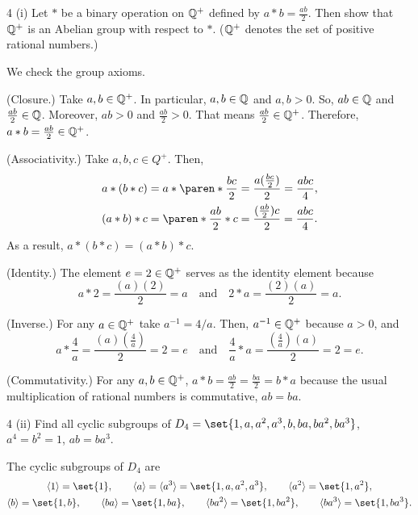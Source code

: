 \documentclass[11pt]{penrose}
\begin{document}
\begin{problem}{4 (i)}
    Let $*$ be a binary operation on $\mathbb{Q}^{+}$ defined by $a * b = \frac{ab}{2}$. Then show that $\mathbb{Q}^{+}$ is an Abelian group with respect to $*$. ($\mathbb{Q}^{+}$ denotes the set of positive rational numbers.)

    \solution We check the group axioms.

    (Closure.) Take $a, b \in \mathbb{Q}^+$. In particular, $a, b \in \mathbb{Q}$ and $a, b > 0$. So, $ab \in \mathbb{Q}$ and $\frac{ab}{2} \in \mathbb{Q}$. Moreover, $ab > 0$ and $\frac{ab}{2} > 0$. That means $\frac{ab}{2} \in \mathbb{Q}^+$. Therefore, $a * b = \frac{ab}{2} \in \mathbb{Q}^+$.

    (Associativity.) Take $a, b, c \in Q^+$. Then,
    \begin{align*}
        a * (b * c) &= a * \paren*{\frac{bc}{2}} = \frac{a(\frac{bc}{2})}{2} = \frac{abc}{4},\\
        (a * b) * c &= \paren*{\frac{ab}{2}} * c = \frac{(\frac{ab}{2})c}{2} = \frac{abc}{4}.
    \end{align*}
    As a result, $a * (b * c) = (a * b) * c$.

    (Identity.) The element $e = 2 \in \mathbb{Q}^+$ serves as the identity element because
    \begin{equation*}
        a * 2 = \frac{(a)(2)}{2} = a
        \quad\text{and}\quad
        2 * a = \frac{(2)(a)}{2} = a.
    \end{equation*}

    (Inverse.) For any $a \in \mathbb{Q}^+$ take $a^{-1} = 4/a$. Then, $a^{-1} \in \mathbb{Q}^+$ because $a > 0$, and
    \begin{equation*}
        a * \frac{4}{a} = \frac{(a)(\frac{4}{a})}{2} = 2 = e
        \quad\text{and}\quad
        \frac{4}{a} * a = \frac{(\frac{4}{a})(a)}{2} = 2 = e.
    \end{equation*}

    (Commutativity.) For any $a, b \in \mathbb{Q}^+$, $a * b = \frac{ab}{2} = \frac{ba}{2} = b * a$
    because the usual multiplication of rational numbers is commutative, $ab = ba$.
\end{problem}

\begin{problem}{4 (ii)}
    Find all cyclic subgroups of $D_4 = \set{1, a, a^2, a^3, b, ba, ba^2, ba^3}$, $a^4 = b^2 = 1$, $ab = ba^3$.

    \solution The cyclic subgroups of $D_4$ are
    \begin{gather*}
        \cyclic{1} = \set{1}, \qquad
        \cyclic{a} = \cyclic{a^3} = \set{1, a, a^2, a^3}, \qquad
        \cyclic{a^2} = \set{1, a^2},\\
        \cyclic{b} = \set{1, b}, \qquad
        \cyclic{ba} = \set{1, ba}, \qquad
        \cyclic{ba^2} = \set{1, ba^2}, \qquad
        \cyclic{ba^3} = \set{1, ba^3}.
    \end{gather*}
\end{problem}
\end{document}
